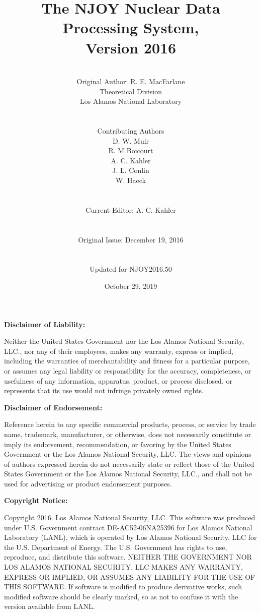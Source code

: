 \documentclass[11pt,twoside]{NJOYMan}
\title{\bf The NJOY Nuclear Data Processing System,\\Version 2016}
\author{\\
  Original Author:  R. E. MacFarlane\\
  Theoretical Division\\
  Los Alamos National Laboratory\\
\\
\\
Contributing Authors\\
D. W. Muir\\
R. M Boicourt\\
A. C. Kahler\\
J. L. Conlin\\
W. Haeck\\
\\
\\
Current Editor:  A. C. Kahler\\
\\
\\
Original Issue:  December 19, 2016\\
\\
\\
Updated for NJOY2016.50
\\}
\date{October 29, 2019}
\renewcommand{\headrulewidth}{0pt}     %
\renewcommand{\footrulewidth}{0pt}}    %
\begin{document}
\maketitle
{}

\clearpage
\fancyhf{}                           %
%
\renewcommand{\headrulewidth}{0pt}   %
\renewcommand{\footrulewidth}{0pt}   %

%
\begin{center} \textbf{Disclaimer of Liability:} \end{center}
Neither the United States Government nor the Los Alamos
National Security, LLC., nor any of their employees, makes any warranty,
express or implied, including the warranties of merchantability and
fitness for a particular purpose, or assumes any legal liability or
responsibility for the accuracy, completeness, or usefulness of any
information, apparatus, product, or process disclosed, or represents
that its use would not infringe privately owned rights.

\vspace{0.25in}
\begin{center} \textbf{Disclaimer of Endorsement:} \end{center}
Reference herein to any specific commercial products,
process, or service by trade name, trademark, manufacturer, or otherwise,
does not necessarily constitute or imply its endorsement, recommendation,
or favoring by the United States Government or the Los Alamos National
Security, LLC. The views and opinions of authors expressed herein do not
necessarily state or reflect those of the United States Government or
the Los Alamos National Security, LLC., and shall not be used for
advertising or product endorsement purposes.

\vspace{0.25in}
\begin{center} \textbf{Copyright Notice:} \end{center}
Copyright 2016. Los Alamos National Security, LLC. This software was
produced under U.S. Government contract DE-AC52-06NA25396 for
Los Alamos National Laboratory (LANL), which is operated by
Los Alamos National Security, LLC for the U.S. Department of
Energy. The U.S. Government has rights to use, reproduce, and
distribute this software.  NEITHER THE GOVERNMENT NOR LOS ALAMOS
NATIONAL SECURITY, LLC MAKES ANY WARRANTY, EXPRESS OR IMPLIED, OR
ASSUMES ANY LIABILITY FOR THE USE OF THIS SOFTWARE.  If software
is modified to produce derivative works, such modified software
should be clearly marked, so as not to confuse it with the version
available from LANL.
\end{document}
